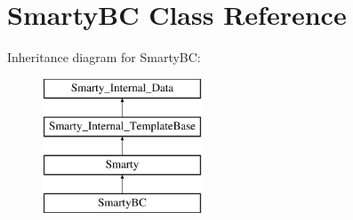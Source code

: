 \hypertarget{class_smarty_b_c}{}\section{Smarty\+B\+C Class Reference}
\label{class_smarty_b_c}
Inheritance diagram for Smarty\+B\+C\+:\begin{figure}[H]
\begin{center}
\leavevmode
\includegraphics[height=4.000000cm]{class_smarty_b_c}
\end{center}
\end{figure}
